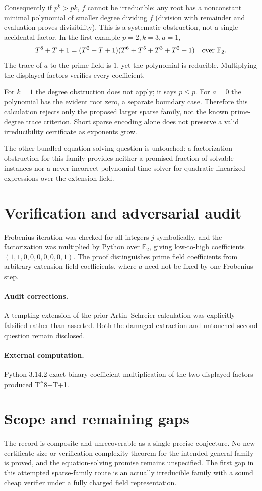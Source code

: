 \documentclass[11pt]{article}
\begin{document}
Consequently if $p^k>pk$, $f$ cannot be irreducible: any root has a nonconstant
minimal polynomial of smaller degree dividing $f$ (division with remainder
and evaluation proves divisibility). This is a systematic obstruction, not a
single accidental factor. In the first example $p=2,k=3,a=1$,
\[
 T^8+T+1=(T^2+T+1)(T^6+T^5+T^3+T^2+1)
 \quad\hbox{over }\mathbb F_2.
\]
The trace of $a$ to the prime field is $1$, yet the polynomial is reducible.
Multiplying the displayed factors verifies every coefficient.

For $k=1$ the degree obstruction does not apply; it says $p\le p$. For
$a=0$ the polynomial has the evident root zero, a separate boundary case.
Therefore this calculation rejects only the proposed larger sparse family,
not the known prime-degree trace criterion. Short sparse encoding alone does
not preserve a valid irreducibility certificate as exponents grow.

The other bundled equation-solving question is untouched: a factorization
obstruction for this family provides neither a promised fraction of solvable
instances nor a never-incorrect polynomial-time solver for quadratic
linearized expressions over the extension field.
\section{Verification and adversarial audit}
Frobenius iteration was checked for all integers $j$ symbolically, and the
factorization was multiplied by Python over $\mathbb F_2$, giving low-to-high
coefficients $(1,1,0,0,0,0,0,0,1)$. The proof distinguishes prime field
coefficients from arbitrary extension-field coefficients, where $a$ need not
be fixed by one Frobenius step.
\paragraph{Audit corrections.} A tempting extension of the prior Artin--Schreier calculation was explicitly falsified rather than asserted. Both the damaged extraction and untouched second question remain disclosed.
\paragraph{External computation.} Python 3.14.2 exact binary-coefficient multiplication of the two displayed factors produced T^8+T+1.
\section{Scope and remaining gaps}
The record is composite and unrecoverable as a single precise conjecture.
No new certificate-size or verification-complexity theorem for the intended
general family is proved, and the equation-solving promise remains unspecified.
The first gap in this attempted sparse-family route is an actually irreducible
family with a sound cheap verifier under a fully charged field representation.
\end{document}
